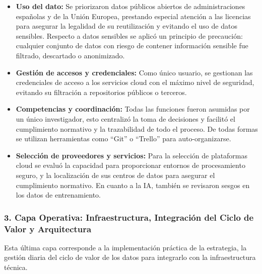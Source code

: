 \begin{itemize}
	\item \textbf{Uso del dato:} Se priorizaron datos públicos abiertos de administraciones españolas y de la Unión Europea, prestando especial atención a las licencias para asegurar la legalidad de su reutilización y evitando el uso de datos sensibles. Respecto a datos sensibles se aplicó un principio de precaución: cualquier conjunto de datos con riesgo de contener información sensible fue filtrado, descartado o anonimizado. 
	
	\item \textbf{Gestión de accesos y credenciales:} Como único usuario, se gestionan las credenciales de acceso a los servicios cloud con el máximo nivel de seguridad, evitando su filtración a repositorios públicos o terceros.
	
	\item \textbf{Competencias y coordinación:} Todas las funciones fueron asumidas por un único investigador, esto centralizó la toma de decisiones y facilitó el cumplimiento normativo y la trazabilidad de todo el proceso. De todas formas se utilizan herramientas como ``Git'' o ``Trello'' para auto-organizarse.
	
	\item \textbf{Selección de proveedores y servicios:} Para la selección de plataformas cloud se evaluó la capacidad para proporcionar entornos de procesamiento seguro, y la localización de sus centros de datos para asegurar el cumplimiento normativo. En cuanto a la IA, también se revisaron sesgos en los datos de entrenamiento.
\end{itemize}

\subsubsection*{3. Capa Operativa: Infraestructura, Integración del Ciclo de Valor y Arquitectura}
Esta última capa corresponde a la implementación práctica de la estrategia, la gestión diaria del ciclo de valor de los datos para integrarlo con la infraestructura técnica.

